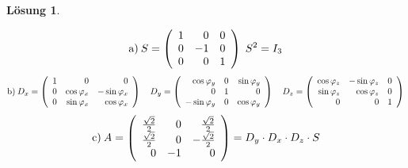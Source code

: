 \documentclass[10pt]{article}
\newtheorem{Lo}{L\"osung}
\begin{document}
\begin{sffamily}
\begin{Lo}  \end{Lo}
\[
\textrm{a)}\: S = \left(\begin{array}{r r r}
                                   1 & 0 & 0\\
                   0 & -1 & 0\\
                   0 & 0 & 1
                                \end{array}
\right)\; S^2 = I_3
\]
\[
\textrm{b)}\:D_x = \left(\begin{array}{r r r}
                                   1 & 0 & 0\\
                   0 & \cos{\varphi_x} & -\sin{\varphi_x}\\
                   0 & \sin{\varphi_x} & \cos{\varphi_x}
                                \end{array}
\right)\quad D_y = \left(\begin{array}{r r r}
                                   \cos{\varphi_y} & 0 & \sin{\varphi_y}\\
                   0 & 1 & 0\\
                   -\sin{\varphi_y} & 0 & \cos{\varphi_y}
                                \end{array}
\right)\quad D_z = \left(\begin{array}{r r r}
                                   \cos{\varphi_z} & -\sin{\varphi_z} & 0\\
                   \sin{\varphi_z} &  \cos{\varphi_z} & 0\\
                   0 & 0 & 1
                                \end{array}
\right)
\]
\[
\textrm{c)}\: A = \left(\begin{array}{r r r}
                                   \frac{\sqrt{2}}{2} & 0 &  \frac{\sqrt{2}}{2}\\
                   \frac{\sqrt{2}}{2} & 0 & -\frac{\sqrt{2}}{2}\\
                   0 & -1 & 0
                                \end{array}
\right) = D_y\cdot D_x\cdot D_z\cdot S
\]




%
%



\end{sffamily}
\end{document}
